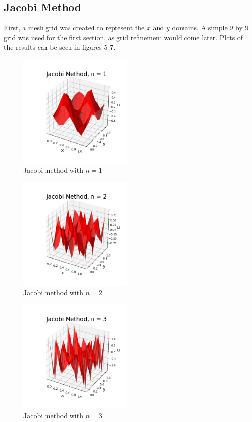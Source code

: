 \documentclass[12pt,a4paper]{report}
\begin{document}
		\subsection{Jacobi Method}
			First,  a  mesh grid was created to represent the $x$ and $y$ domains.  A simple $9$ by
			$9$ grid was used for the first section, as grid refinement would come later.  Plots of
			the results can be seen in figures 5-7.

			\begin{figure}[h]
				\centering
					\includegraphics[width=0.5\textwidth]{jmn1.png}
					\caption{Jacobi method with $n=1$}
			\end{figure}

			\begin{figure}[h]
				\centering
					\includegraphics[width=0.5\textwidth]{jmn2.png}
					\caption{Jacobi method with $n=2$}
			\end{figure}

			\begin{figure}[h]
				\centering
					\includegraphics[width=0.5\textwidth]{jmn3.png}
					\caption{Jacobi method with $n=3$}
			\end{figure}
\end{document}
